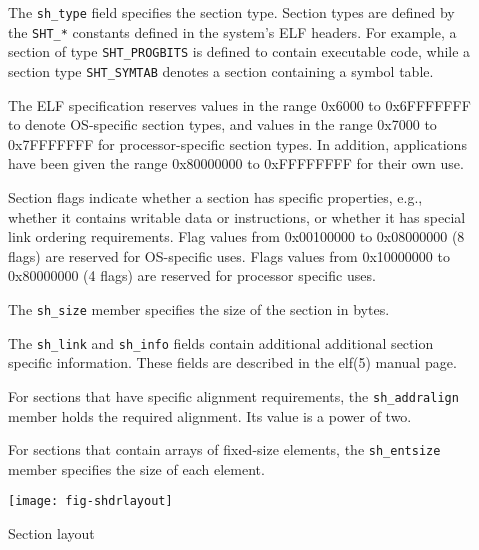 \documentclass[a4paper,pdftex]{book}
\makeatletter
\newcommand{\constant}[1]{\texttt{#1}}
\newcommand{\parameter}[1]{\texttt{#1}}
\newenvironment{callout}[2][black]{%
  \begingroup\newcommand{\@cocolor}{#1}%
  \setlength{\shadowsize}{1.2pt}%
  \newcommand{\@cogroup}[1]{#2}}{\endgroup}
\newcommand{\@co}[1]{\shadowbox{\color{\@cocolor}#1}}
\newcommand{\coref}[1]{%
  \hypertarget{\@cogroup.#1.cr}{%
    \hyperlink{\@cogroup.#1.co}{\@co{#1}}}}
\makeatother
\begin{document}
\begin{callout}{shdr}
\begin{description}
  \item[\coref{2}] The \parameter{sh\_type} field specifies the
    section type.  Section types are defined by the \constant{SHT\_*}
    constants defined in the system's ELF headers.  For example, a
    section of type \constant{SHT\_PROGBITS} is defined to contain
    executable code, while a section type \constant{SHT\_SYMTAB}
    denotes a section containing a symbol table.%

    The ELF specification reserves values in the range 0x6000 to
    0x6FFF\-FFFF to denote OS-specific section types, and values in the
    range 0x7000 to 0x7FFF\-FFFF for processor-specific section
    types.  In addition, applications have been given the range
    0x80000000 to 0xFFFFFFFF for their own use.%

  \item[\coref{3}] Section flags indicate whether a section has
    specific properties, e.g., whether it contains writable data or
    instructions, or whether it has special link ordering
    requirements.  Flag values from 0x00100000 to 0x08000000 (8 flags)
    are reserved for OS-specific uses.  Flags values from 0x10000000
    to 0x80000000 (4 flags) are reserved for processor specific uses.%

  \item[\coref{4}] The \parameter{sh\_size} member specifies the size
    of the section in bytes.%

  \item[\coref{5} \coref{6}] The \parameter{sh\_link} and
    \parameter{sh\_info} fields contain additional additional section
    specific information.  These fields are described in the elf(5)
    manual page.

  \item[\coref{7}] For sections that have specific alignment
    requirements, the \parameter{sh\_addralign} member holds the
    required alignment.  Its value is a power of two.%

  \item[\coref{8}] For sections that contain arrays of fixed-size
    elements, the \parameter{sh\_entsize} member specifies the size of
    each element.%
  \end{description}
\end{callout}

\begin{figure}
  \begin{center}
    \texttt{[image: fig-shdrlayout]}
  \end{center}
  \caption{Section layout}\label{fig.elf.shdrlayout}
\end{figure}
\end{document}
